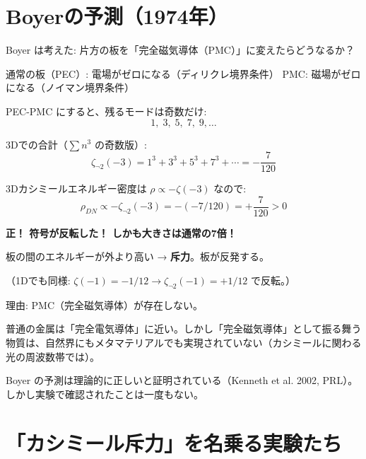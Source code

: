 \documentclass[12pt,a4paper]{article}
\begin{document}
\section{Boyerの予測（1974年）}

\begin{resultbox}[もし片端を変えたら？]
Boyer は考えた: 片方の板を「完全磁気導体（PMC）」に変えたらどうなるか？

通常の板（PEC）: 電場がゼロになる（ディリクレ境界条件）
PMC: 磁場がゼロになる（ノイマン境界条件）

PEC-PMC にすると、残るモードは奇数だけ:
$$1, \; 3, \; 5, \; 7, \; 9, \ldots$$

3Dでの合計（$\sum n^3$ の奇数版）:
$$\zeta_{\neg 2}(-3) = 1^3 + 3^3 + 5^3 + 7^3 + \cdots = -\frac{7}{120}$$

3Dカシミールエネルギー密度は $\rho \propto -\zeta(-3)$ なので:
$$\rho_{DN} \propto -\zeta_{\neg 2}(-3) = -(-7/120) = +\frac{7}{120} > 0$$

\textbf{正！ 符号が反転した！ しかも大きさは通常の7倍！}

板の間のエネルギーが外より高い → \textbf{斥力}。板が反発する。

（1Dでも同様: $\zeta(-1) = -1/12 \to \zeta_{\neg 2}(-1) = +1/12$ で反転。）
\end{resultbox}

\begin{honestbox}[50年間誰もこれを実験で確認していない]
理由: PMC（完全磁気導体）が存在しない。

普通の金属は「完全電気導体」に近い。しかし「完全磁気導体」として振る舞う物質は、自然界にもメタマテリアルでも実現されていない（カシミールに関わる光の周波数帯では）。

Boyer の予測は理論的に正しいと証明されている（Kenneth et al. 2002, PRL）。しかし実験で確認されたことは一度もない。
\end{honestbox}

\section{「カシミール斥力」を名乗る実験たち}
\end{document}
